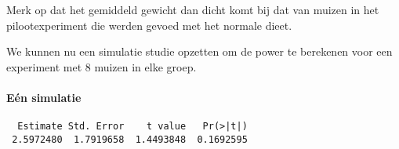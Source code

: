 \documentclass[
]{article}
\newenvironment{Shaded}{\begin{snugshade}}{\end{snugshade}}
\newcommand{\AttributeTok}[1]{\textcolor[rgb]{0.77,0.63,0.00}{#1}}
\newcommand{\DecValTok}[1]{\textcolor[rgb]{0.00,0.00,0.81}{#1}}
\newcommand{\FloatTok}[1]{\textcolor[rgb]{0.00,0.00,0.81}{#1}}
\newcommand{\FunctionTok}[1]{\textcolor[rgb]{0.00,0.00,0.00}{#1}}
\newcommand{\NormalTok}[1]{#1}
\newcommand{\OtherTok}[1]{\textcolor[rgb]{0.56,0.35,0.01}{#1}}
\newcommand{\SpecialCharTok}[1]{\textcolor[rgb]{0.00,0.00,0.00}{#1}}
\begin{document}
Merk op dat het gemiddeld gewicht dan dicht komt bij dat van muizen in
het pilootexperiment die werden gevoed met het normale dieet.

We kunnen nu een simulatie studie opzetten om de power te berekenen voor
een experiment met 8 muizen in elke groep.

\hypertarget{euxe9n-simulatie}{%
\paragraph{Eén simulatie}\label{euxe9n-simulatie}}

\begin{Shaded}
\end{Shaded}

\begin{verbatim}
  Estimate Std. Error    t value   Pr(>|t|) 
 2.5972480  1.7919658  1.4493848  0.1692595 
\end{verbatim}
\end{document}
